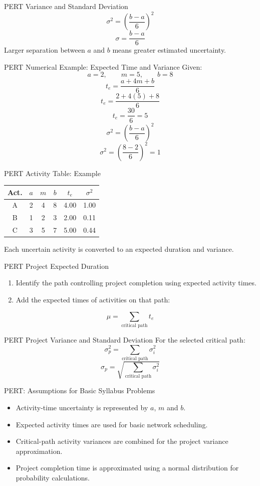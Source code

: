 \documentclass[aspectratio=169,10pt]{beamer}
\begin{document}
\begin{frame}{PERT Variance and Standard Deviation}
\[
\boxed{\sigma^2=\left(\frac{b-a}{6}\right)^2}
\]
\[
\boxed{\sigma=\frac{b-a}{6}}
\]
\vspace{0.2cm}
Larger separation between $a$ and $b$ means greater estimated uncertainty.
\end{frame}

\begin{frame}{PERT Numerical Example: Expected Time and Variance}
Given:
\[
a=2,\qquad m=5,\qquad b=8
\]
\pause
\[t_e=\frac{a+4m+b}{6}\]
\pause
\[t_e=\frac{2+4(5)+8}{6}\]
\pause
\[t_e=\frac{30}{6}=\boxed{5}\]
\pause
\[\sigma^2=\left(\frac{b-a}{6}\right)^2\]
\pause
\[\sigma^2=\left(\frac{8-2}{6}\right)^2=\boxed{1}\]
\end{frame}

\begin{frame}{PERT Activity Table: Example}
\centering
\begin{tabular}{c|ccc|cc}
\toprule
Act. & $a$ & $m$ & $b$ & $t_e$ & $\sigma^2$\\
\midrule
A & 2 & 4 & 8 & 4.00 & 1.00\\
B & 1 & 2 & 3 & 2.00 & 0.11\\
C & 3 & 5 & 7 & 5.00 & 0.44\\
\bottomrule
\end{tabular}
\vspace{0.3cm}

Each uncertain activity is converted to an expected duration and variance.
\end{frame}

\begin{frame}{PERT Project Expected Duration}
\begin{enumerate}
  \item Identify the path controlling project completion using expected activity times.
  \item Add the expected times of activities on that path:
\end{enumerate}
\[
\boxed{\mu=\sum_{\text{critical path}}t_e}
\]
\end{frame}

\begin{frame}{PERT Project Variance and Standard Deviation}
For the selected critical path:
\[
\boxed{\sigma_p^2=\sum_{\text{critical path}}\sigma_i^2}
\]
\[
\boxed{\sigma_p=\sqrt{\sum_{\text{critical path}}\sigma_i^2}}
\]
\end{frame}

\begin{frame}{PERT: Assumptions for Basic Syllabus Problems}
\begin{itemize}
  \item Activity-time uncertainty is represented by $a$, $m$ and $b$.
  \item Expected activity times are used for basic network scheduling.
  \item Critical-path activity variances are combined for the project variance approximation.
  \item Project completion time is approximated using a normal distribution for probability calculations.
\end{itemize}
\end{frame}
\end{document}
